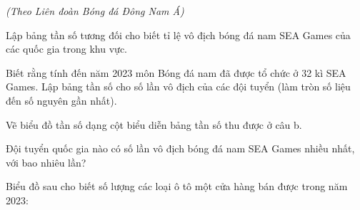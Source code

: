\begin{practice}
\begin{questions}[resume=SBT]
\begin{center}

        \emph{(Theo Liên đoàn Bóng đá Đông Nam Á)}
        \end{center}

        \begin{questions}
            \item Lập bảng tần số tương đối cho biết tỉ lệ vô địch bóng đá nam SEA Games của các quốc gia trong khu vực.

            \answerline
            \answerline

            \item Biết rằng tính đến năm 2023 môn Bóng đá nam đã được tổ chức ở 32 kì SEA Games. Lập bảng tần số cho số lần vô địch của các đội tuyển (làm tròn số liệu đến số nguyên gần nhất).

            \answerline
            \answerline
            \answerline

            \item Vẽ biểu đồ tần số dạng cột biểu diễn bảng tần số thu được ở câu b.

            \answerline
            \answerline
            \answerline

            \item Đội tuyển quốc gia nào có số lần vô địch bóng đá nam SEA Games nhiều nhất, với bao nhiêu lần?

            \answerline
        \end{questions}

        \item Biểu đồ sau cho biết số lượng các loại ô tô một cửa hàng bán được trong năm 2023:


\end{questions}
\end{practice}
